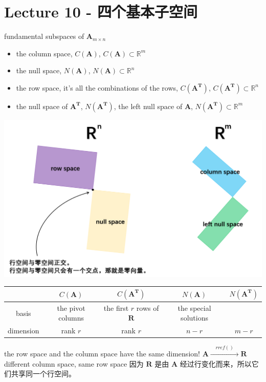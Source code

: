 \documentclass[12pt, a4paper]{article}
\begin{document}
{\newpage
\section{Lecture 10 - 四个基本子空间}
\pagestyle{fancy}
\lhead{}
\rhead{}

 fundamental subspaces of ${\mathbf{A}}_{m \times n}$
\begin{itemize}
	\item the column space, $C({\mathbf{A}})$, $C({\mathbf{A}}) \subset \mathbb{R}^m$
	\item the null space, $N({\mathbf{A}})$, $N({\mathbf{A}}) \subset \mathbb{R}^n$
	\item the row space, it's all the combinations of the rows, $C({\mathbf{A^{T}}})$, $C({\mathbf{A^{T}}}) \subset \mathbb{R}^n$
	\item the null space of ${\mathbf{A^{T}}}$, $N({\mathbf{A^{T}}})$, the left null space of ${\mathbf{A}}$, $N({\mathbf{A^{T}}}) \subset \mathbb{R}^m$
\end{itemize}
\begin{center}
	\includegraphics[scale=0.8]{figures/S10-1.png}
\end{center}
\begin{center}
	\begin{tabular}{ c c c c c }
		\toprule
		\ & $C({\mathbf{A}})$ & $C({\mathbf{A^{T}}})$ & $N({\mathbf{A}})$ & $N({\mathbf{A^{T}}})$ \\
		\toprule
		basis & the pivot columns & the first $r$ rows of ${\mathbf{R}}$ & the special solutions & \ \\
		\hline
		dimension & rank $r$ & rank $r$ & $n-r$ & $m-r$ \\
		\bottomrule
	\end{tabular}
\end{center}
{\textcolor{anhao-scarlet}{the row space and the column space have the same dimension!}}
\vspace{14pt}
\newline
\begin{math}
	{\mathbf{A}} \xrightarrow{\quad rref() \quad} {\mathbf{R}}
\end{math}
\quad different column space, same row space
\newline
{\textcolor{anhao-scarlet}{因为 ${\mathbf{R}}$ 是由 ${\mathbf{A}}$ 经过行变化而来，所以它们共享同一个行空间。}}

}
\end{document}
